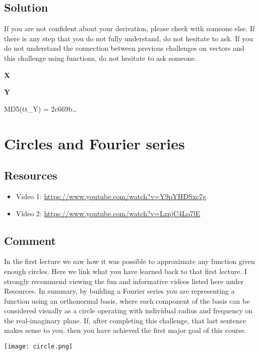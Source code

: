 \subsection*{Solution}
If you are not confident about your derivation, please check with someone else. If there is any step that you do not fully understand, do not hesitate to ask. If you do not understand the connection between previous challenges on vectors and this challenge using functions, do not hesitate to ask someone.

\textbf{X}


\textbf{Y}

MD5(tt\_Y) = 2c669b\ldots

\timebox




\newpage
\section{Circles and Fourier series}

\subsection*{Resources}
\begin{itemize}
    \item Video 1: \url{https://www.youtube.com/watch?v=Y9pYHDSxc7g}
    \item Video 2: \url{https://www.youtube.com/watch?v=LznjC4Lo7lE}
\end{itemize}

\subsection*{Comment}
In the first lecture we saw how it was possible to approximate any function given enough circles. Here we link what you have learned back to that first lecture. I strongly recommend viewing the fun and informative videos listed here under Resources. In summary, by building a Fourier series you are representing a function using an orthonormal basis, where each component of the basis can be considered visually as a circle operating with individual radius and frequency on the real-imaginary plane. If, after completing this challenge, that last sentence makes sense to you, then you have achieved the first major goal of this course.

\texttt{[image: circle.png]}

